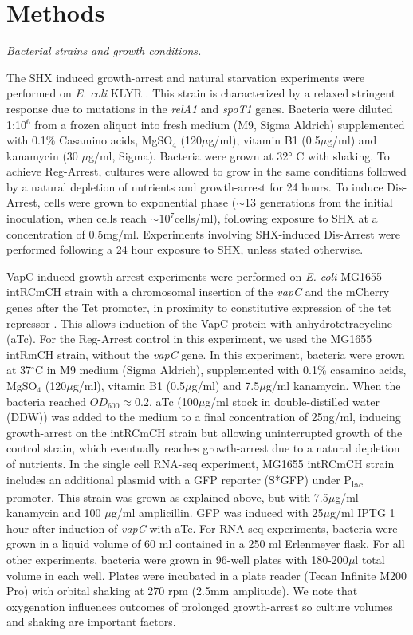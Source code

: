 \documentclass[12pt]{article}
\begin{document}
\section{Methods}
\textit{Bacterial strains and growth conditions.}\par
The SHX induced growth-arrest and natural starvation experiments were performed on \textit{E. coli} KLYR \cite{Kaplan2021}. This strain is characterized by a relaxed stringent response due to mutations in the \textit{relA1} \cite{METZGER198921146} and \textit{spoT1} \cite{Fiil1977} genes. Bacteria were diluted 1:10$^6$ from a frozen aliquot into fresh medium (M9, Sigma Aldrich) supplemented with 0.1\% Casamino acids, MgSO$_4$ (120$\mu$g/ml), vitamin B1 (0.5$\mu$g/ml) and kanamycin (30 $\mu$g/ml, Sigma). Bacteria were grown at 32° C with shaking. To achieve Reg-Arrest, cultures were allowed to grow in the same conditions followed by a natural depletion of nutrients and growth-arrest for 24 hours. To induce Dis-Arrest, cells were grown to exponential phase ($\sim$13 generations from the initial inoculation, when cells reach $\sim10^7$cells/ml), following exposure to SHX at a concentration of 0.5mg/ml. Experiments involving SHX-induced Dis-Arrest were performed following a 24 hour exposure to SHX, unless stated otherwise. \par
VapC induced growth-arrest experiments were performed on \textit{E. coli} MG1655 intRCmCH strain with a chromosomal insertion of the \textit{vapC} and the mCherry genes after the Tet promoter, in proximity to constitutive expression of the tet repressor \cite{Ronine2025}. This allows induction of the VapC protein with anhydrotetracycline (aTc). For the Reg-Arrest control in this experiment, we used the MG1655 intRmCH strain, without the \textit{vapC} gene. In this experiment, bacteria were grown at 37$^\circ$C in M9 medium (Sigma Aldrich), supplemented with 0.1\% casamino acids, MgSO$_4$ (120$\mu$g/ml), vitamin B1 (0.5$\mu$g/ml) and 7.5$\mu$g/ml kanamycin. When the bacteria reached $OD_{600}\approx0.2$, aTc (100$\mu$g/ml stock in double-distilled water (DDW)) was added to the medium to a final concentration of 25ng/ml, inducing growth-arrest on the intRCmCH strain but allowing uninterrupted growth of the control strain, which eventually reaches growth-arrest due to a natural depletion of nutrients. In the single cell RNA-seq experiment, MG1655 intRCmCH strain includes an additional plasmid with a GFP reporter (S*GFP) under P\textsubscript{lac} promoter. This strain was grown as explained above, but with 7.5$\mu$g/ml kanamycin and 100 $\mu$g/ml amplicillin. GFP was induced with 25$\mu$g/ml IPTG 1 hour after induction of \textit{vapC} with aTc. For RNA-seq experiments, bacteria were grown in a liquid volume of 60 ml contained in a 250 ml Erlenmeyer flask. For all other experiments, bacteria were grown in 96-well plates with 180-200$\mu$l total volume in each well. Plates were incubated in a plate reader (Tecan Infinite M200 Pro) with orbital shaking at 270 rpm (2.5mm amplitude). We note that oxygenation influences outcomes of prolonged growth-arrest so culture volumes and shaking are important factors.
\end{document}
